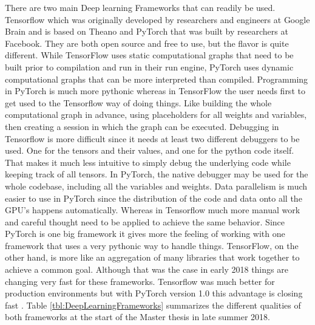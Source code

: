 There are two main Deep learning Frameworks that can readily be used. Tensorflow \cite{tensorflow} which was originally developed by researchers and engineers at Google Brain and is based on Theano and PyTorch \cite{pytorch} that was built by researchers at Facebook. They are both open source and free to use, but the flavor is quite different. While TensorFlow uses static computational graphs that need to be built prior to compilation and run in their run engine, PyTorch uses dynamic computational graphs that can be more interpreted than compiled. Programming in PyTorch is much more pythonic whereas in TensorFlow the user needs first to get used to the Tensorflow way of doing things. Like building the whole computational graph in advance, using placeholders for all weights and variables, then creating a session in which the graph can be executed. Debugging in Tensorflow is more difficult since it needs at least two different debuggers to be used. One for the tensors and their values, and one for the python code itself. That makes it much less intuitive to simply debug the underlying code while keeping track of all tensors. In PyTorch, the native debugger may be used for the whole codebase, including all the variables and weights. Data parallelism is much easier to use in PyTorch since the distribution of the code and data onto all the GPU's happens automatically. Whereas in Tensorflow much more manual work and careful thought need to be applied to achieve the same behavior. Since PyTorch is one big framework it gives more the feeling of working with one framework that uses a very pythonic way to handle things. TensorFlow, on the other hand, is more like an aggregation of many libraries that work together to achieve a common goal. Although that was the case in early 2018 things are changing very fast for these frameworks. Tensorflow was much better for production environments but with PyTorch version 1.0 this advantage is closing fast \cite{pytorchOnePointZero}. Table \ref{tbl:DeepLearningFrameworks} summarizes the different qualities of both frameworks at the start of the Master thesis in late summer 2018. \\

